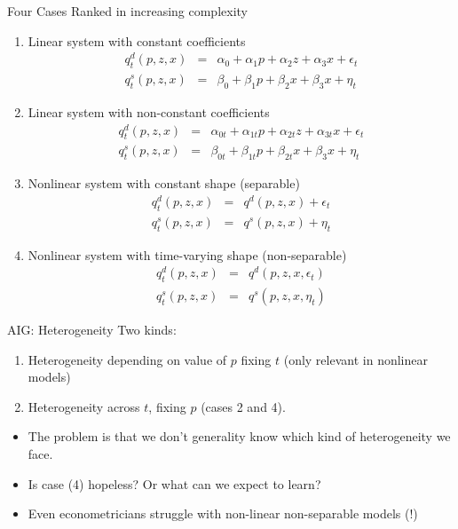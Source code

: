 \documentclass[xcolor=pdftex,dvipsnames,table,mathserif]{beamer}
\begin{document}
\begin{frame}{Four Cases}
Ranked in increasing complexity
\small
\begin{enumerate}
\item Linear system with constant coefficients
\begin{eqnarray*}
q_t^d(p,z,x) &=& \alpha_0 + \alpha_1 p + \alpha_2 z + \alpha_3 x + \epsilon_t \\
q_t^s(p,z,x) &=& \beta_0 + \beta_1 p + \beta_2 x + \beta_3 x + \eta_t
\end{eqnarray*}
\item Linear system with non-constant coefficients
\begin{eqnarray*}
q_t^d(p,z,x) &=& \alpha_{0t} + \alpha_{1t} p + \alpha_{2t} z + \alpha_{3t} x + \epsilon_t \\
q_t^s(p,z,x) &=& \beta_{0t} + \beta_{1t} p + \beta_{2t} x + \beta_{3} x + \eta_t
\end{eqnarray*}
\item Nonlinear system with constant shape (separable)
\begin{eqnarray*}
q_t^d(p,z,x) &=& q^d(p,z,x)+ \epsilon_t \\
q_t^s(p,z,x) &=& q^s(p,z,x)+ \eta_t
\end{eqnarray*}
\item Nonlinear system with time-varying shape (non-separable)
\begin{eqnarray*}
q_t^d(p,z,x) &=& q^d(p,z,x,\epsilon_t) \\
q_t^s(p,z,x) &=& q^s(p,z,x,\eta_t)
\end{eqnarray*}
\end{enumerate}
\end{frame}

\begin{frame}{AIG: Heterogeneity}
Two kinds:
\begin{enumerate}
\item Heterogeneity depending on value of $p$ fixing $t$ (only relevant in nonlinear models)
\item Heterogeneity across $t$, fixing $p$ (cases 2 and 4).
\end{enumerate}
\begin{itemize}
\item The problem is that we don't generality know which kind of heterogeneity we face.
\item Is case (4) hopeless? Or what can we expect to learn?
\item Even econometricians struggle with non-linear non-separable models (!)
\end{itemize}
\end{frame}
\end{document}
